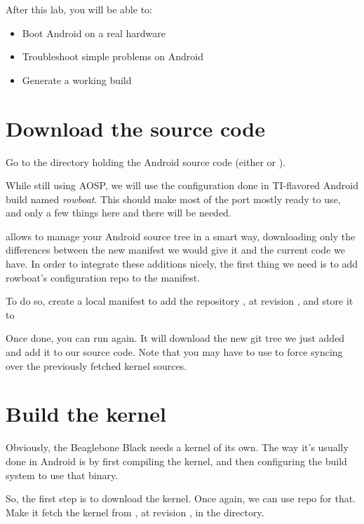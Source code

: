 
After this lab, you will be able to:
\begin{itemize}
  \item Boot Android on a real hardware
  \item Troubleshoot simple problems on Android
  \item Generate a working build
\end{itemize}

\section{Download the source code}

Go to the directory holding the Android source code (either
 or ).

While still using AOSP, we will use the configuration done in
TI-flavored Android build named \emph{rowboat}. This should make most
of the port mostly ready to use, and only a few things here and there
will be needed.

 allows to manage your Android source tree in a smart way,
downloading only the differences between the new manifest we would
give it and the current code we have. In order to integrate these
additions nicely, the first thing we need is to add rowboat's
configuration repo to the manifest.

To do so, create a local manifest to add the repository
,
at revision , and store it to

Once done, you can run  again. It will download the
new git tree we just added and add it to our source code.
Note that you may have to use  to
force syncing over the previously fetched kernel sources.

\section{Build the kernel}

Obviously, the Beaglebone Black needs a kernel of its own. The way
it's usually done in Android is by first compiling the kernel, and
then configuring the build system to use that binary.

So, the first step is to download the kernel. Once again, we can use
repo for that. Make it fetch the kernel from
, at revision
, in the  directory.

